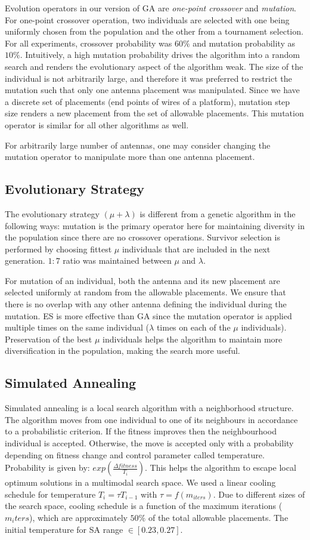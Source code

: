 \documentclass[conference]{IEEEtran}
\begin{document}
Evolution operators in our version of GA are \textit{one-point crossover} and \textit{mutation}. For one-point crossover operation, two individuals are selected with one being uniformly chosen from the population and the other from a tournament selection. For all experiments, crossover probability was $60\%$ and mutation probability as $10\%$. Intuitively, a high mutation probability drives the algorithm into a random search and renders the evolutionary aspect of the algorithm weak. The size of the individual is not arbitrarily large, and therefore it was preferred to restrict the mutation such that only one antenna placement was manipulated. Since we have a discrete set of placements (end points of wires of a platform), mutation step size renders a new placement from the set of allowable placements. This mutation operator is similar for all other algorithms as well.

For arbitrarily large number of antennas, one may consider changing the mutation operator to manipulate more than one antenna placement. 
\subsection{Evolutionary Strategy}
\label{sec:algorithms-es}
The evolutionary strategy $(\mu + \lambda)$ is different from a genetic algorithm in the following ways: 
mutation is the primary operator here for maintaining diversity in the population since there are no crossover operations. Survivor selection is performed by choosing fittest $\mu$ individuals that are included in the next generation. $1:7$ ratio was maintained between $\mu$ and $\lambda$. 

For mutation of an individual, both the antenna and its new placement are selected uniformly at random from the allowable placements. We ensure that there is no overlap with any other antenna defining the individual during the mutation. ES is more effective than GA since the mutation operator is applied multiple times on the same individual ($\lambda$ times on each of the $\mu$ individuals). Preservation of the best $\mu$ individuals helps the algorithm to maintain more diversification in the population, making the search more useful.
\subsection{Simulated Annealing}
\label{sec:algoriths-sa}
Simulated annealing is a local search algorithm with a neighborhood structure. The algorithm moves from one individual to one of its neighbours in accordance to a probabilistic criterion. If the fitness improves then the neighbourhood individual is accepted. Otherwise, the move is accepted only with a probability depending on fitness change and control parameter called temperature. Probability is given by: $exp( \frac{\Delta fitness}{T_i})$. This helps the algorithm to escape local optimum solutions in a multimodal search space. We used a linear cooling schedule for temperature $T_i = \tau T_{i-1}$ with $\tau = f(m_{iters})$. Due to different sizes of the search space, cooling schedule is a function of the maximum iterations ($m_iters$), which are approximately $50\%$ of the total allowable placements. The initial temperature for SA range $\in [0.23, 0.27]$.
\end{document}
